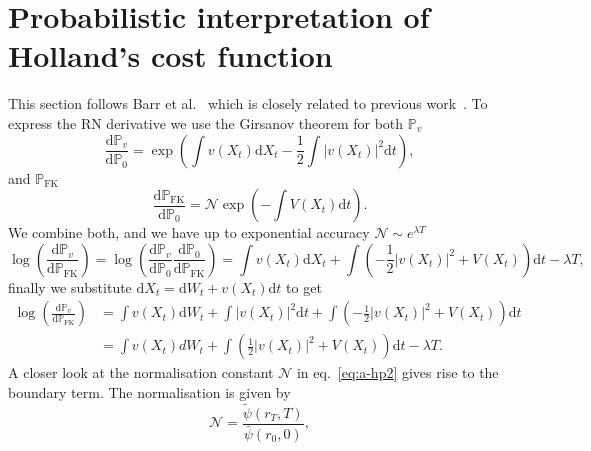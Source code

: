 \section{Probabilistic interpretation of Holland's cost function}
\label{app:holland-prob}
This section follows Barr et al.~\cite{barr2020quantum} which is closely related to previous work~\cite{dai1990markov}. To express the RN derivative we use the Girsanov theorem for both $\mathbb{P}_v$
\begin{equation}
	\frac{\mathrm{d} \mathbb{P}_{v}}{\mathrm{d} \mathbb{P}_{0}}=\exp \left(\int v\left(X_{t}\right) \mathrm{d} X_{t}-\frac{1}{2} \int\left|v\left(X_{t}\right)\right|^{2} \mathrm{d} t\right),
\end{equation}
and $\mathbb{P}_{\mathrm{FK}}$
\begin{equation}
	\label{eq:a-hp2}
	\frac{\mathrm{d} \mathbb{P}_{\mathrm{FK}}}{\mathrm{d} \mathbb{P}_{0}}=\mathcal{N} \exp \left(-\int V\left(X_{t}\right) \mathrm{d} t\right).
\end{equation}
We combine both, and we have up to exponential accuracy $\mathcal{N} \sim e^{\lambda T}$
\begin{equation}
	\log \left(\frac{\mathrm{d} \mathbb{P}_{v}}{\mathrm{d} \mathbb{P}_{\mathrm{FK}}}\right)=\log \left(\frac{\mathrm{d} \mathbb{P}_{v}}{\mathrm{d} \mathbb{P}_{0}} \frac{\mathrm{d} \mathbb{P}_{0}}{\mathrm{d} \mathbb{P}_{\mathrm{FK}}}\right) = \int v\left(X_{t}\right) \mathrm{d} X_{t}+\int \left(-\frac{1}{2}\left|v\left(X_{t}\right)\right|^{2}+V\left(X_{t}\right)\right)\mathrm{d} t - \lambda T,
\end{equation}
finally we substitute $\mathrm{d} X_t = \mathrm{d}W_t + v(X_t)\mathrm{d}t$ to get
\begin{equation}
	\begin{aligned}
	\log \left(\frac{\mathrm{d} \mathbb{P}_{v}}{\mathrm{d} \mathbb{P}_{\mathrm{FK}}}\right) 
	& =  \int v\left(X_{t}\right) \mathrm{d} W_{t} + \int |v(X_t)|^2 \mathrm{d}t + \int \left(-\frac{1}{2}\left|v\left(X_{t}\right)\right|^{2}+V\left(X_{t}\right)\right)\mathrm{d} t\\
	& =  \int v\left(X_{t}\right) d W_{t}+\int \left(\frac{1}{2}\left|v\left(X_{t}\right)\right|^{2}+V\left(X_{t}\right)\right) \mathrm{d}t  - \lambda T.
	\end{aligned}
\end{equation}
A closer look at the normalisation constant $\mathcal{N}$ in eq.~\eqref{eq:a-hp2} gives rise to the boundary term. The normalisation is given by
\begin{equation}
	\mathcal N = \frac{\tilde{\psi}\left(r_{T}, T\right)}{\bar{\psi}\left(r_{0}, 0\right)},
\end{equation}
